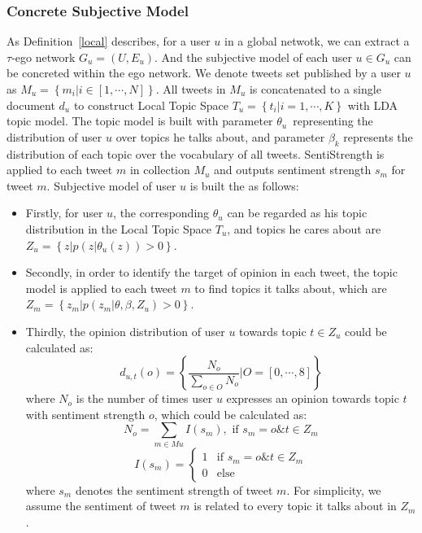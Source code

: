 \documentclass[letterpaper]{article}
\begin{document}
\subsubsection{Concrete Subjective Model}
\label{concrete}
 
As Definition~\ref{local} describes, for a user $ u $ in a global netwotk, we can extract a $ \tau $-ego network $ G_{u}=\left( U,E_{u} \right)  $. 
And the subjective model of each user $ u \in G_{u} $ can be concreted within the ego network. 
We denote tweets set published by a user $ u $ as $ M_{u}=\left\lbrace m_{i} \vert i \in \left[ 1, \cdots, N \right]  \right\rbrace$. All tweets in $ M_{u} $ is concatenated to a single document $ d_{u} $ to construct Local Topic Space $ T_{u}=\left\lbrace t_{i} \vert i=1, \cdots, K \right\rbrace $ with LDA topic model.
The topic model is built with parameter $ \theta_{u} $\ representing the distribution of user $ u $ over topics he talks about, and parameter $ \beta_{k} $ represents the distribution of each topic over the vocabulary of all tweets. SentiStrength is applied to each tweet $ m $ in collection $ M_{u} $ and outputs sentiment strength $ s_{m} $ for tweet $ m $. 
Subjective model of user $ u $ is built the  as follows:
\begin{itemize}
\item Firstly, for user $ u $, the corresponding $ \theta_{u} $ can be regarded as his topic distribution in the Local Topic Space $ T_{u} $, and topics he cares about are $ Z_{u}= \left\lbrace z \vert p\left( z \vert \theta_{u}\left( z \right)  \right)>0 \right\rbrace $.
\item Secondly, in order to identify the target of opinion in each tweet, the topic model is applied to each tweet $ m $ to find topics it talks about, which are $ Z_{m} =\left\lbrace z_{m} \vert p\left( z_{m} \vert \theta, \beta, Z_{u} \right)>0 \right\rbrace $.
\item Thirdly, the opinion distribution of user $ u $ towards topic $ t \in Z_{u} $ could be calculated as: 
\begin{equation}
\label{opinionall}
d_{u,t}\left( o \right) = \left\lbrace \dfrac{N_{o}}{\sum_{o \in O} N_{o}} \vert O=\left[ 0, \cdots, 8 \right] \right\rbrace 
\end{equation}
where $ N_{o} $ is the number of times user $ u $ expresses an opinion towards topic $ t $ with sentiment strength $ o $, which could be calculated as:
\begin{equation}
\label{opinion1}
N_{o}=\sum_{m \in Mu} I\left( s_{m} \right) , \text{ if } s_{m}=o \& t \in Z_{m}
\end{equation}
\begin{equation}
\label{opinion2}
I\left( s_{m} \right)=\left\{
\begin{array}{ll}
{1} & \text{if } s_{m}=o \& t \in Z_{m}\\
{0} & \text{else}
\end{array}
\right.
\end{equation}
where $ s_{m} $ denotes the sentiment strength of tweet $ m $. For simplicity, we assume the sentiment of tweet $ m $ is related to every topic it talks about in $ Z_{m} $.
\end{itemize}
\end{document}
